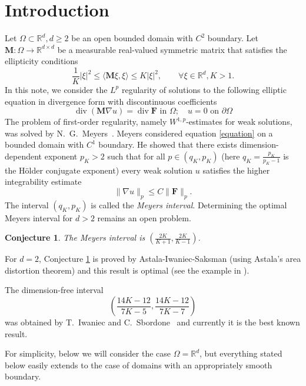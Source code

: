 \documentclass[12pt,reqno]{amsart}
\newtheorem{Conjecture}{Conjecture}
\newcommand{\R}{{\mathbb R}}
\newcommand{\M}{{\mathbf M}}
\begin{document}
\section{Introduction}
Let $\Omega \subset {\mathbb R}^d, d\geq 2$ be an open bounded domain with $C^2$ boundary. Let $\M:\Omega \rightarrow \R^{d\times d}$ be a measurable real-valued symmetric matrix that satisfies the ellipticity conditions
\begin{equation*}
\frac{1}{K} |\xi|^2 \leq\langle \M\xi,\xi \rangle \leq K |\xi|^2, \qquad  \forall \xi \in \mathbb{R}^d, K > 1.
\end{equation*}
In this note, we consider the $L^p$ regularity of solutions to the following elliptic equation in divergence form with discontinuous coefficients
\begin{equation}\label{equation}
\operatorname{div}(\M\nabla u) = \operatorname{div}\mathbf{F}  \text{ in } \Omega;\quad u = 0  \text{ on } \partial \Omega
\end{equation}
The problem of first-order regularity, namely $W^{1,p}$-estimates for weak solutions,
was solved by N.~G.~Meyers~\cite{M}. Meyers considered equation \eqref{equation} on a bounded domain with $C^1$ boundary. He showed that there exists dimension-dependent exponent $p_K > 2$  such that for all $p\in (q_K,p_K)$ (here $q_K=\frac{p_K}{p_K-1}$ is the H\"older conjugate exponent) every weak solution $u$ satisfies the higher integrability estimate
\begin{equation}\label{Meyers1}
  	\| \nabla u\|_p \leq C\|\mathbf{F}\|_p.
\end{equation}
The interval $(q_K,p_K)$ is called the \textit{Meyers interval}. Determining the optimal Meyers interval for $d>2$ remains an open problem.
\begin{Conjecture}\label{Conj}
The Meyers interval is $(\frac{2K}{K+1},\frac{2K}{K-1})$.
\end{Conjecture}
For $d=2$, Conjecture \ref{Conj} is proved by Astala-Iwaniec-Saksman \cite{AIS} (using Astala's area distortion theorem) and this result is optimal (see the example in \cite{M}).
\par
The dimension-free interval
\begin{equation}\label{ISpK}
\left(\frac{14K-12}{7K-5},\frac{14K-12}{7K-7}\right)
\end{equation}
was obtained by T.~Iwaniec and C.~Sbordone~\cite[Theorem 2]{IS2001} and currently it is the best known result.
\par
For simplicity, below we will consider the case $\Omega=\R^d$, but everything stated below easily extends to the case of domains with an appropriately smooth boundary.
\end{document}
